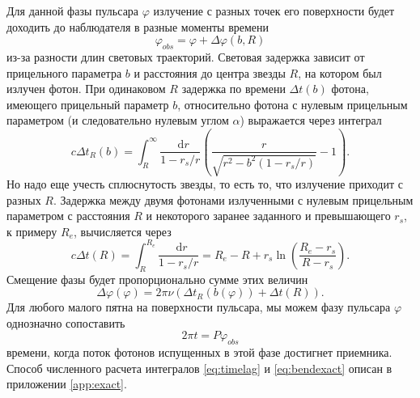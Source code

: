 \documentclass[14pt,a4paper]{extarticle}
\newcommand{\be}{\begin{equation}}
\newcommand{\ee}{\end{equation}}
\newcommand*\df {\mathop{}\!\mathrm{d}}
\begin{document}
		    Для данной фазы пульсара $\varphi$ излучение с разных точек его поверхности будет доходить до наблюдателя в разные моменты времени \be\label{eq:timedelay}
		    \varphi_{obs} = 
		    \varphi+\Delta\varphi(b,R)\ee
		    из-за разности длин световых траекторий.  
		    Световая задержка зависит от прицельного параметра $b$ и расстояния до центра звезды $R$, на котором был излучен фотон. 
		    При одинаковом 	$R$ задержка по времени $\Delta t(b)$  фотона, имеющего прицельный параметр $b$, относительно фотона с нулевым прицельным параметром (и следовательно нулевым углом $\alpha$) выражается \cite{Pechenick1983} через интеграл 
		    \be\label{eq:timelag}
		    	c\Delta t_R(b) = \int_R^{\infty} \frac{\df r}{1-r_s/r}\left(\frac{r}{\sqrt{r^2-b^2(1-r_s/r)}}-1\right).
		    \ee 
		    Но надо еще учесть сплюснутость звезды, то есть то, что излучение приходит с разных $R$. 
		    Задержка между двумя фотонами излученными с нулевым прицельным параметром с расстояния $R$ и некоторого заранее заданного и превышающего $r_s$, к примеру $R_e$, вычисляется через 
		    \be
		    	c\Delta t(R) = \int_R^{R_e} \frac{\df r }{1-r_s/r} = R_e-R+r_s \ln\left(\frac{R_e-r_s}{R-r_s}\right).
			\ee 
			Смещение фазы будет пропорционально сумме этих величин
			\be
				\Delta\varphi(\varphi)= 2\pi\nu(\Delta t_R(b(\varphi)) +\Delta t(R)).
			\ee
			Для любого малого пятна на поверхности пульсара, мы можем  фазу пульсара $\varphi$ однозначно сопоставить
			\be2 \pi t=P\varphi_{obs}\ee
			времени, когда поток фотонов испущенных в этой фазе достигнет приемника.    
		    Способ численного расчета интегралов \eqref{eq:timelag} и \eqref{eq:bendexact} описан в приложении \ref{app:exact}.
\end{document}

